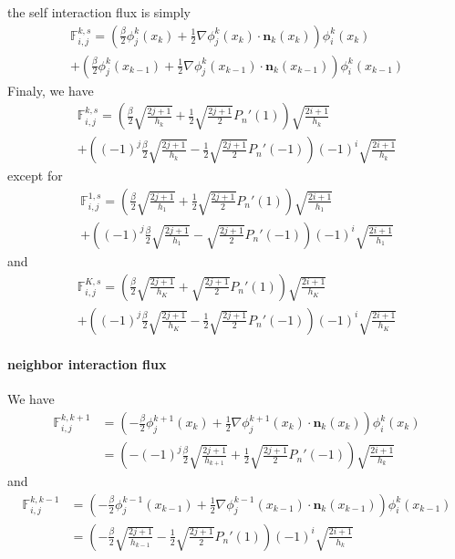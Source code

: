 \documentclass[a4paper,10pt,draft]{article}
\begin{document}
the self interaction flux is simply
\begin{multline*}
 \mathbb{F}_{i,j}^{k,s} 
 = \left( \frac{\beta}{2} \phi_j^k(x_k) + \frac{1}{2} \nabla \phi_j^k(x_k) \cdot \mathbf{n}_k(x_k) 
\right) \phi_i^k(x_k) \\
+ \left( \frac{\beta}{2} \phi_j^k(x_{k-1}) + \frac{1}{2} \nabla \phi_j^k(x_{k-1}) \cdot 
\mathbf{n}_k(x_{k-1}) \right) \phi_i^k(x_{k-1})
\end{multline*}
Finaly, we have
\begin{multline*}
 \mathbb{F}_{i,j}^{k,s} = \left( \frac{\beta}{2} \sqrt{\frac{2j+1}{h_k}} + \frac{1}{2} 
\sqrt{\frac{2j+1}{2}}P_{n}'(1) \right) \sqrt{\frac{2i+1}{h_k}} \\
+ \left( (-1)^j \frac{\beta}{2} \sqrt{\frac{2j+1}{h_k}} - \frac{1}{2} \sqrt{\frac{2j+1}{2}} 
P_{n}'(-1) \right)(-1)^i \sqrt{\frac{2i+1}{h_k}} 
\end{multline*}
except for
\begin{multline*}
 \mathbb{F}_{i,j}^{1,s} = \left( \frac{\beta}{2} \sqrt{\frac{2j+1}{h_1}} + \frac{1}{2} 
\sqrt{\frac{2j+1}{2}}P_{n}'(1) \right) \sqrt{\frac{2i+1}{h_1}} \\
+ \left( (-1)^j \frac{\beta}{2} \sqrt{\frac{2j+1}{h_1}} - \sqrt{\frac{2j+1}{2}} 
P_{n}'(-1) \right)(-1)^i \sqrt{\frac{2i+1}{h_1}} 
\end{multline*}
and
\begin{multline*}
 \mathbb{F}_{i,j}^{K,s} = \left( \frac{\beta}{2} \sqrt{\frac{2j+1}{h_K}} + 
\sqrt{\frac{2j+1}{2}}P_{n}'(1) \right) \sqrt{\frac{2i+1}{h_K}} \\
+ \left( (-1)^j \frac{\beta}{2} \sqrt{\frac{2j+1}{h_K}} - \frac{1}{2} \sqrt{\frac{2j+1}{2}} 
P_{n}'(-1) \right)(-1)^i \sqrt{\frac{2i+1}{h_K}} 
\end{multline*}

\paragraph{neighbor interaction flux}

We have
\begin{align*} 
\mathbb{F}_{i,j}^{k,k+1} &=
\left( -\frac{\beta}{2} \phi_j^{k+1}(x_k) + \frac{1}{2} \nabla \phi_j^{k+1}(x_k) \cdot 
\mathbf{n}_k(x_k) \right) \phi_i^k(x_k)\\
&= \left(-(-1)^j \frac{\beta}{2} \sqrt{\frac{2j+1}{h_{k+1}}} + \frac{1}{2} 
\sqrt{\frac{2j+1}{2}}P_{n}'(-1) \right) \sqrt{\frac{2i+1}{h_k}}
\end{align*}
and
\begin{align*} 
\mathbb{F}_{i,j}^{k,k-1} &=
\left( -\frac{\beta}{2} \phi_j^{k-1}(x_{k-1}) + \frac{1}{2} \nabla \phi_j^{k-1}(x_{k-1}) \cdot 
\mathbf{n}_k(x_{k-1}) \right) \phi_i^k(x_{k-1})\\
&= \left(-\frac{\beta}{2} \sqrt{\frac{2j+1}{h_{k-1}}} - \frac{1}{2} 
\sqrt{\frac{2j+1}{2}}P_{n}'(1) \right) (-1)^i \sqrt{\frac{2i+1}{h_k}}
\end{align*}
\end{document}
